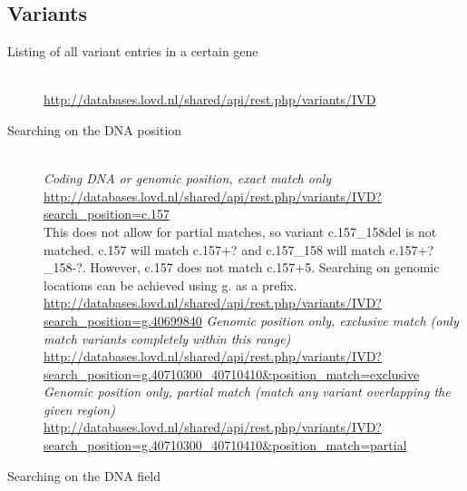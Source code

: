 \documentclass[a4paper,oneside,openany,12pt]{memoir}
\begin{document}
\subsection{Variants}
\begin{description}
  \item[Listing of all variant entries in a certain gene]\hfill \\
  \href{http://databases.lovd.nl/shared/api/rest.php/variants/IVD}
       {http://databases.lovd.nl/shared/api/rest.php/variants/IVD}
  \item[Searching on the DNA position]\hfill \\
  \emph{Coding DNA or genomic position, exact match only}\\
  \href{http://databases.lovd.nl/shared/api/rest.php/variants/IVD?search_position=c.157}
       {http://databases.lovd.nl/shared/api/rest.php/variants/IVD?search\_position=c.157}\\
       This does not allow for partial matches, so variant c.157\_158del is not matched.
       c.157 will match c.157+? and c.157\_158 will match c.157+?\_158-?.
       However, c.157 does not match c.157+5.
       Searching on genomic locations can be achieved using g. as a prefix.\\
       \href{http://databases.lovd.nl/shared/api/rest.php/variants/IVD?search_position=g.40699840}
            {http://databases.lovd.nl/shared/api/rest.php/variants/IVD?search\_position=g.40699840}
  \emph{Genomic position only, exclusive match (only match variants completely within this range)}\\
  \href{http://databases.lovd.nl/shared/api/rest.php/variants/IVD?search_position=g.40710300_40710410&position_match=exclusive}
       {http://databases.lovd.nl/shared/api/rest.php/variants/IVD?\\
       \phantom{..........}search\_position=g.40710300\_40710410\&position\_match=exclusive}\\
  \emph{Genomic position only, partial match (match any variant overlapping the given region)}\\
  \href{http://databases.lovd.nl/shared/api/rest.php/variants/IVD?search_position=g.40710300_40710410&position_match=partial}
       {http://databases.lovd.nl/shared/api/rest.php/variants/IVD?\\
       \phantom{..........}search\_position=g.40710300\_40710410\&position\_match=partial}
  \clearpage
  \item[Searching on the DNA field]\hfill \\

\end{description}
\end{document}
